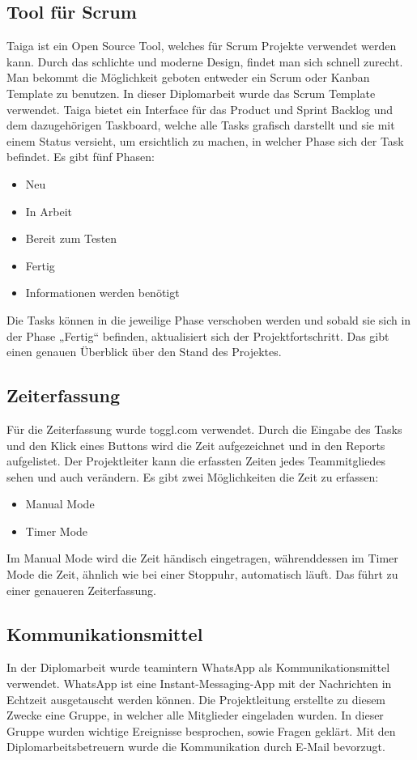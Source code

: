 \subsection{Tool für Scrum}
Taiga ist ein Open Source Tool, welches für Scrum Projekte verwendet werden kann. Durch das schlichte und moderne Design, findet man sich schnell zurecht. Man bekommt die Möglichkeit geboten entweder ein Scrum oder Kanban Template zu benutzen. In dieser Diplomarbeit wurde das Scrum Template verwendet. Taiga bietet ein Interface für das Product und Sprint Backlog und dem dazugehörigen Taskboard, welche alle Tasks grafisch darstellt und sie mit einem Status versieht, um ersichtlich zu machen, in welcher Phase sich der Task befindet. Es gibt fünf Phasen: 
\begin{itemize}
\item Neu
\item In Arbeit
\item Bereit zum Testen
\item Fertig
\item Informationen werden benötigt
\end{itemize}
Die Tasks können in die jeweilige Phase verschoben werden und sobald sie sich in der Phase „Fertig“ befinden, aktualisiert sich der Projektfortschritt. Das gibt einen genauen Überblick über den Stand des Projektes. 

\subsection{Zeiterfassung}
Für die Zeiterfassung wurde toggl.com verwendet. Durch die Eingabe des Tasks und den Klick eines Buttons wird die Zeit aufgezeichnet und in den Reports aufgelistet. Der Projektleiter kann die erfassten Zeiten jedes Teammitgliedes sehen und auch verändern. Es gibt zwei Möglichkeiten die Zeit zu erfassen:
\begin{itemize}
\item Manual Mode
\item Timer Mode
\end{itemize}
Im Manual Mode wird die Zeit händisch eingetragen, währenddessen im Timer Mode die Zeit, ähnlich wie bei einer Stoppuhr, automatisch läuft. Das führt zu einer genaueren Zeiterfassung. 

\subsection{Kommunikationsmittel}
In der Diplomarbeit wurde teamintern WhatsApp als Kommunikationsmittel verwendet. WhatsApp ist eine Instant-Messaging-App mit der Nachrichten in Echtzeit ausgetauscht werden können. Die Projektleitung erstellte zu diesem Zwecke eine Gruppe, in welcher alle Mitglieder eingeladen wurden. In dieser Gruppe wurden wichtige Ereignisse besprochen, sowie Fragen geklärt. 
Mit den Diplomarbeitsbetreuern wurde die Kommunikation durch E-Mail bevorzugt. 

